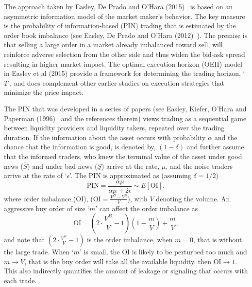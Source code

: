 The approach taken by Easley, De Prado and O'Hara (2015)~\cite{prado2} is based on an asymmetric information model of the market maker's behavior. The key measure is the probability of information-based (PIN) trading that is estimated by the order book imbalance (see Easley, De Prado and O'Hara (2012)~\cite{prado3}). The premise is that selling a large order in a market already imbalanced toward sell, will reinforce adverse selection from the other side and thus widen the bid-ask spread resulting in higher market impact. The optimal execution horizon (OEH) model in Easley et al (2015) provide a framework for determining the trading horizon, `$T$', and does complement other earlier studies on execution strategies that minimize the price impact. 


The PIN that was developed in a series of papers (see Easley, Kiefer, O'Hara and Paperman (1996)~\cite{paper} and the references therein) views trading as a sequential game between liquidity providers and liquidity takers, repeated over the trading duration. If the information about the asset occurs with probability $\alpha$ and the chance that the information is good, is denoted by, $(1 - \delta)$ and further assume that the informed traders, who knew the terminal value of the asset under good news ($\overline{S}$) and under bad news ($\underline{S}$) arrive at the rate, $\mu$, and the noise traders arrive at the rate of `$\epsilon$'. The PIN is approximated as (assuming $\delta= 1/2$)
	\begin{equation} \label{eqn:pin}
	\text{PIN}= \dfrac{\alpha\mu}{\alpha\mu + 2\epsilon} \sim E[\text{OI}],
	\end{equation}
where order imbalance (OI), ($\text{OI}= \frac{V^B - V^S}{V}$), with $V$ denoting the volume. An aggressive buy order of size `$m$' can affect the order imbalance as
	\begin{equation} \label{eqn:oi}
	\text{OI}=\left( 2 \cdot \dfrac{V^B}{V} - 1 \right) \left(1 - \dfrac{m}{V} \right) + \dfrac{m}{V},
	\end{equation}
and note that $\left( 2 \cdot \frac{V^B}{V} - 1 \right)$ is the order imbalance, when $m= 0$, that is without the large trade. When `$m$' is small, the OI is likely to be perturbed too much and $m \to V$, that is the buy order will take all the available liquidity, then $\text{OI} \to1$. This also indirectly quantifies the amount of leakage or signaling that occurs with each trade.


